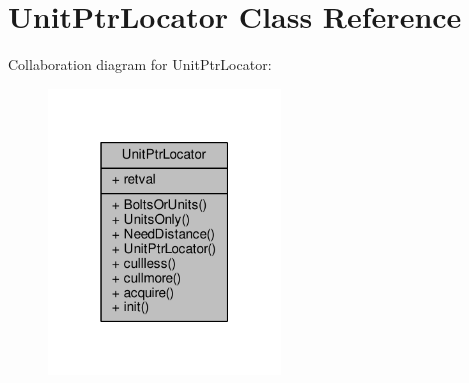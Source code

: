 \hypertarget{classUnitPtrLocator}{}\section{Unit\+Ptr\+Locator Class Reference}
\label{classUnitPtrLocator}


Collaboration diagram for Unit\+Ptr\+Locator\+:
\nopagebreak
\begin{figure}[H]
\begin{center}
\leavevmode
\includegraphics[width=175pt]{d8/d2d/classUnitPtrLocator__coll__graph}
\end{center}
\end{figure}
